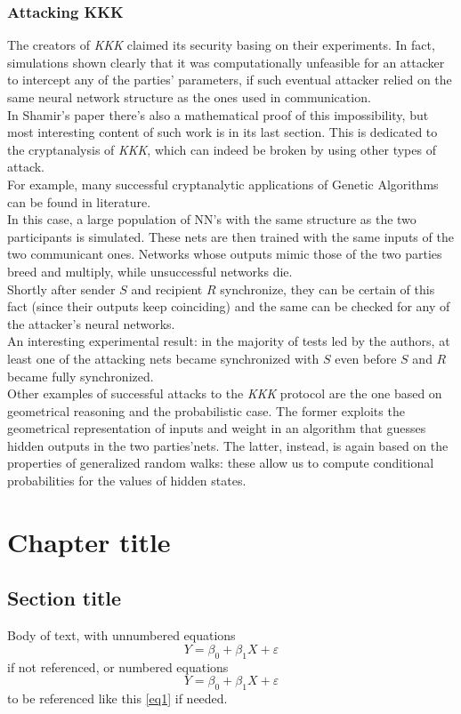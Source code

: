 \documentclass[%
    corpo=11pt,
    twoside,
    stile=classica,
    oldstyle,
    autoretitolo,
    tipotesi=magistrale,
    greek,
    evenboxes,
    english
]{toptesi}
\begin{document}
\subsection{Attacking KKK}
\label{ssc:atk}
The creators of \textit{KKK} claimed its security basing on their experiments. In fact, simulations shown clearly that it was computationally unfeasible for an attacker to intercept any of the parties' parameters, if such eventual attacker relied on the same neural network structure as the ones used in communication. \\
In Shamir's paper there's also a mathematical proof of this impossibility, but most interesting content of such work is in its last section. This is dedicated to the cryptanalysis of \textit{KKK}, which can indeed be broken by using other types of attack. \\
For example, many successful cryptanalytic applications of Genetic Algorithms can be found in literature. \\
In this case, a large population of NN's with the same structure as the two participants is simulated. These nets are then trained with the same inputs of the two communicant ones. Networks whose outputs mimic those of the two parties breed and multiply, while unsuccessful networks die. \\
Shortly after sender $S$ and recipient $R$ synchronize, they can be certain of this fact (since their outputs keep coinciding) and the same can be checked for any of the attacker's neural networks. \\
An interesting experimental result: in the majority of tests led by the authors, at least one  of the attacking nets became synchronized with $S$ even before $S$ and $R$ became fully synchronized. \\
Other examples of successful attacks to the \textit{KKK} protocol are the one based on geometrical reasoning and the probabilistic case. The former exploits the geometrical representation of inputs and weight in an algorithm that guesses hidden outputs in the two parties'nets. The latter, instead, is again based on the properties of generalized random walks: these allow us to compute conditional probabilities for the values of hidden states.



\chapter{Chapter title}

\section{Section title}
Body of text, with unnumbered equations 
\begin{equation*}%
Y=\beta_{0}+\beta_{1}X+\varepsilon
\end{equation*} 
if not referenced, or numbered equations
\begin{equation}\label{eq1}
Y=\beta_{0}+\beta_{1}X+\varepsilon
\end{equation} 
to be referenced like this \eqref{eq1} if needed. 
\end{document}
